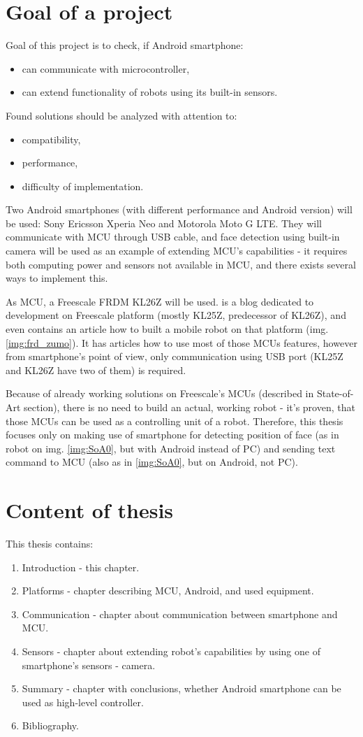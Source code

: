 \documentclass[openany]{mgr} %
\begin{document}
\section{Goal of a project}
Goal of this project is to check, if Android smartphone:
\begin{itemize}
  \item can communicate with microcontroller,
  \item can extend functionality of robots using its built-in sensors.
\end{itemize}
Found solutions should be analyzed with attention to:
\begin{itemize}
  \item compatibility,
  \item performance,
  \item difficulty of implementation.
\end{itemize}
Two Android smartphones (with different performance and Android version) will be
used: Sony Ericsson Xperia Neo and Motorola Moto G LTE. They will communicate
with MCU through USB cable, and face detection using built-in camera will be
used as an example of extending MCU's capabilities - it requires both computing
power and sensors not available in MCU, and there exists several ways to
implement this.

As MCU, a Freescale FRDM KL26Z will be used. \cite{mcu_on_eclipse} is a blog
dedicated to development on Freescale platform (mostly KL25Z, predecessor of
KL26Z), and even contains an article how to built a mobile robot on that
platform (img. \ref{img:frd_zumo}). It has articles how to use most of
those MCUs features, however from smartphone's point of view, only communication
using USB port (KL25Z and KL26Z have two of them) is required.

Because of already working solutions on Freescale's MCUs (described in
State-of-Art section), there is no need to build an actual, working robot - it's
proven, that those MCUs can be used as a controlling unit of a robot. Therefore,
this thesis focuses only on making use of smartphone for detecting position of
face (as in robot on img. \ref{img:SoA0}, but with Android instead of PC) and
sending text command to MCU (also as in \ref{img:SoA0}, but on Android, not PC).

\section{Content of thesis}
This thesis contains:
\begin{enumerate}
  \item Introduction - this chapter.
  \item Platforms - chapter describing MCU, Android, and used equipment.
  \item Communication - chapter about communication between smartphone and MCU.
  \item Sensors - chapter about extending robot's capabilities by using one of
  smartphone's sensors - camera.
  \item Summary - chapter with conclusions, whether Android smartphone can be
  used as high-level controller.
  \item Bibliography.
\end{enumerate}
\end{document}
